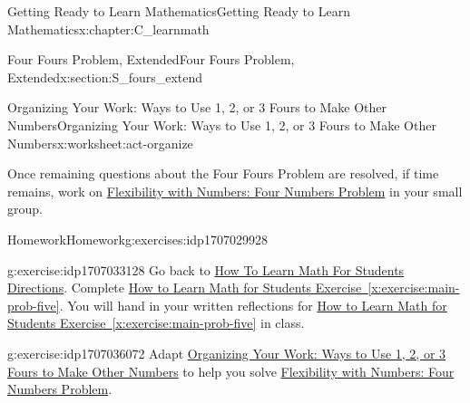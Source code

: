 \documentclass[oneside,10pt,]{book}
\newcommand{\xreffont}{\relax}
\newlength{\fillinmaxwidth}
\newlength{\fillincontract}
\newlength{\fillinheight}
\newcommand{\fillintext}[1]{%
\setlength{\fillinmaxwidth}{#1em*\real{0.5}}%
\setlength{\fillincontract}{#1em*\real{0.5}*\real{0.2}}%
\setlength{\fillinheight}{\heightof{\strut}+1.2pt}%
\strut\nobreak\leaders\vbox{\hrule width 0.3pt height 0.3pt \vskip -1.2pt}\hskip 1\fillinmaxwidth minus \fillincontract\nobreak\strut%
}
\numberwithin{equation}{chapter}
\begin{document}
\begin{chapterptx}{Getting Ready to Learn Mathematics}{}{Getting Ready to Learn Mathematics}{}{}{x:chapter:C_learnmath}
\begin{sectionptx}{Four Fours Problem, Extended}{}{Four Fours Problem, Extended}{}{}{x:section:S_fours_extend}
\begin{worksheet-subsection}{Organizing Your Work: Ways to Use 1, 2, or 3 Fours to Make Other Numbers}{}{Organizing Your Work: Ways to Use 1, 2, or 3 Fours to Make Other Numbers}{}{}{x:worksheet:act-organize}
\begin{conclusion}{}
\par
Once remaining questions about the Four Fours Problem are resolved, if time remains, work on \hyperref[x:worksheet:act-four-nums-prob]{Flexibility with Numbers: Four Numbers Problem} in your small group.%
\end{conclusion}%
\end{worksheet-subsection}
\restoregeometry
%
%
\typeout{************************************************}
\typeout{************************************************}
%
\begin{exercises-subsection}{Homework}{}{Homework}{}{}{g:exercises:idp1707029928}
\begin{divisionexercise}{1}{}{}{g:exercise:idp1707033128}%
Go back to \hyperlink{x:paragraphs:htlmfs-directions}{How To Learn Math For Students Directions}. Complete \hyperref[x:exercise:main-prob-five]{How to Learn Math for Students Exercise~{\xreffont\ref{x:exercise:main-prob-five}}}. You will hand in your written reflections for \hyperref[x:exercise:main-prob-five]{How to Learn Math for Students Exercise~{\xreffont\ref{x:exercise:main-prob-five}}} in class.%
\end{divisionexercise}%
%
\begin{divisionexercise}{3}{}{}{g:exercise:idp1707036072}%
Adapt \hyperref[x:worksheet:act-organize]{Organizing Your Work: Ways to Use 1, 2, or 3 Fours to Make Other Numbers} to help you solve \hyperref[x:worksheet:act-four-nums-prob]{Flexibility with Numbers: Four Numbers Problem}.%
\end{divisionexercise}%

\end{exercises-subsection}
\end{sectionptx}
\end{chapterptx}
\end{document}
